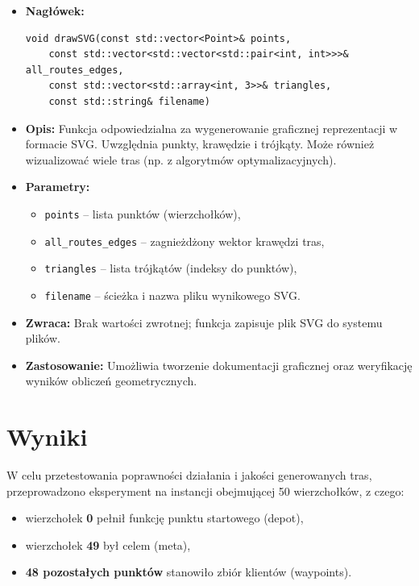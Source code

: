 \documentclass{article}
\begin{document}
\begin{itemize}
    \item \textbf{Nagłówek:}
    \begin{verbatim}
void drawSVG(const std::vector<Point>& points,
    const std::vector<std::vector<std::pair<int, int>>>& all_routes_edges,
    const std::vector<std::array<int, 3>>& triangles,
    const std::string& filename)
    \end{verbatim}

    \item \textbf{Opis:}
    Funkcja odpowiedzialna za wygenerowanie graficznej reprezentacji w formacie SVG. Uwzględnia punkty, krawędzie i trójkąty. Może również wizualizować wiele tras (np. z algorytmów optymalizacyjnych).

    \item \textbf{Parametry:}
    \begin{itemize}
        \item \texttt{points} – lista punktów (wierzchołków),
        \item \texttt{all\_routes\_edges} – zagnieżdżony wektor krawędzi tras,
        \item \texttt{triangles} – lista trójkątów (indeksy do punktów),
        \item \texttt{filename} – ścieżka i nazwa pliku wynikowego SVG.
    \end{itemize}

    \item \textbf{Zwraca:}
    Brak wartości zwrotnej; funkcja zapisuje plik SVG do systemu plików.

    \item \textbf{Zastosowanie:}
    Umożliwia tworzenie dokumentacji graficznej oraz weryfikację wyników obliczeń geometrycznych.
\end{itemize}


\section{Wyniki}

W celu przetestowania poprawności działania i jakości generowanych tras, przeprowadzono eksperyment na instancji obejmującej 50 wierzchołków, z czego:
\begin{itemize}
    \item wierzchołek \textbf{0} pełnił funkcję punktu startowego (depot),
    \item wierzchołek \textbf{49} był celem (meta),
    \item \textbf{48 pozostałych punktów} stanowiło zbiór klientów (waypoints).
\end{itemize}
\end{document}
